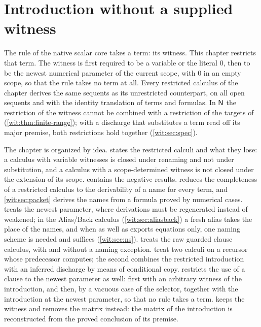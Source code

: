 \chapter{Introduction without a supplied witness}
\label{prov:ch:wit}
\label{wit:ch}

The rule  of the native scalar core takes a term: its witness.
This chapter restricts that term.  The witness is first required to be a
variable or the literal $0$, then to be the newest numerical parameter of the
current scope, with $0$ in an empty scope, so that the rule takes no term at
all.  Every restricted calculus of the chapter derives the same sequents as
its unrestricted counterpart, on all open sequents and with the identity
translation of terms and formulas.  In $\mathsf{N}$ the restriction of the
witness cannot be combined with a restriction of the targets of
 (\cref{wit:thm:finite-range}); with a discharge that
substitutes a term read off its major premise, both restrictions hold
together (\cref{wit:sec:spec}).

The chapter is organized by idea.   states the
restricted calculi and what they lose: a calculus with variable witnesses is
closed under renaming and not under substitution, and a calculus with a
scope-determined witness is not closed under the extension of its scope.
 contains the negative results.
 reduces the completeness of a restricted calculus to the
derivability of a name for every term, and \cref{wit:sec:packet} derives the
names from a formula proved by numerical cases.   treats
the newest parameter, where derivations must be regenerated instead of
weakened; in the Alias/Back calculus (\cref{wit:sec:aliasback}) a fresh
alias takes the place of the names, and when  as well as
 exports equations only, one naming scheme is needed and
suffices (\cref{wit:sec:ns}).   treats the raw guarded clause calculus, with
and without a naming exception.   treat
two calculi on a recursor whose predecessor computes; the second combines the
restricted introduction with an inferred discharge by means of conditional
copy.   restricts the use of a clause to the newest
parameter as well: first with an arbitrary witness of the introduction, and
then, by a vacuous case of the selector, together with the introduction at
the newest parameter, so that no rule takes a term.
 keeps the witness and removes the matrix instead: the
matrix of the introduction is reconstructed from the proved conclusion of its
premise.

